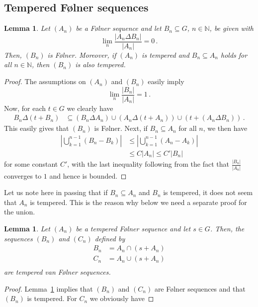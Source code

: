 \documentclass [14pt]{amsart}
\numberwithin{equation}{section}
\newcommand{\NN}{\mathbb N}
\newtheorem{lemma}[theorem]{Lemma}
\begin{document}
\begin{appendix}

\section{Tempered F\o lner sequences}\label{tempered}

\begin{lemma}\label{lem:fol} Let $(A_n)$ be a F\o lner sequence and let  $B_n \subseteq G$, $n\in \NN$, be  given with
\[
\lim_n \frac{|A_n \Delta B_n|}{|A_n|} = 0 \,.
\]
Then, $(B_n)$ is F\o lner.  Moreover, if $(A_n)$ is tempered and $B_n \subseteq A_n$ holds for all $n\in \NN$,  then $(B_n)$ is also tempered.
\end{lemma}
\begin{proof} The assumptions on $(A_n)$ and $(B_n)$ easily  imply
\[
\lim_n \frac{|B_n|}{|A_n|}=1 \,.
\]
Now, for each $t \in G$ we clearly  have
\begin{align*}
  B_n \Delta (t+B_n) & \subseteq \left( B_n \Delta A_n \right) \cup \left( A_n \Delta (t+A_n) \right) \cup (t+(A_n \Delta B_n)) \,.
\end{align*}
This easily  gives that  $(B_n)$ is F\o lner. Next, if $B_n \subseteq A_n$ for all $n$, we then have
\begin{align*}
  \left| \bigcup_{k=1}^{n-1} (B_n-B_k) \right| & \leq   \left| \bigcup_{k=1}^{n-1} (A_n-A_k) \right| \\
   &\leq C |A_n| \leq C'|B_n|
\end{align*}
for some constant $C'$, with the last inequality following from the fact that $\frac{|B_n|}{|A_n|}$ converges to $1$ and hence is bounded.
\end{proof}

Let us note here in passing that if $B_n \subseteq A_n$ and $B_n$ is tempered, it does not seem that $A_n$ is tempered. This is the reason why below we need a separate proof for the union.


\begin{lemma}\label{Folner2} Let $(A_n)$ be a tempered F\o lner sequence and let $s \in G$. Then, the sequences $(B_n)$ and $(C_n)$ defined by
\begin{align*}
  B_n & =A_n \cap (s+A_n)\\
  C_n & =A_n \cup (s+A_n)\\
 \end{align*}
 are tempered van F\o lner sequences.
\end{lemma}
\begin{proof}
Lemma~\ref{lem:fol} implies that $(B_n)$ and $(C_n)$ are F\o lner sequences and that $(B_n)$ is tempered. For $C_n$ we obviously have


\end{proof}
\end{appendix}
\end{document}
